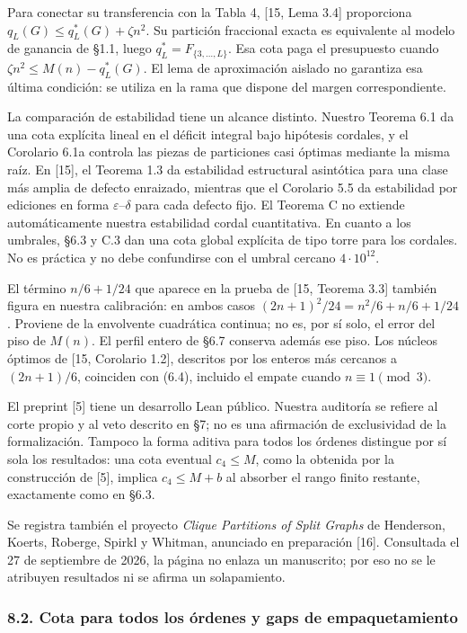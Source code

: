 \documentclass[spanish,11pt,a4paper]{article}
\begin{document}
Para conectar su transferencia con la Tabla 4, {[}15, Lema 3.4{]} proporciona \(q_L(G)\le q_L^*(G)+\zeta n^2\). Su partición fraccional exacta es equivalente al modelo de ganancia de §1.1, luego \(q_L^*=F_{\{3,\ldots,L\}}\). Esa cota paga el presupuesto cuando \(\zeta n^2\le M(n)-q_L^*(G)\). El lema de aproximación aislado no garantiza esa última condición: se utiliza en la rama que dispone del margen correspondiente.

La comparación de estabilidad tiene un alcance distinto. Nuestro Teorema 6.1 da una cota explícita lineal en el déficit integral bajo hipótesis cordales, y el Corolario 6.1a controla las piezas de particiones casi óptimas mediante la misma raíz. En {[}15{]}, el Teorema 1.3 da estabilidad estructural asintótica para una clase más amplia de defecto enraizado, mientras que el Corolario 5.5 da estabilidad por ediciones en forma \(\varepsilon\)--\(\delta\) para cada defecto fijo. El Teorema C no extiende automáticamente nuestra estabilidad cordal cuantitativa. En cuanto a los umbrales, §6.3 y C.3 dan una cota global explícita de tipo torre para los cordales. No es práctica y no debe confundirse con el umbral cercano \(4\cdot10^{12}\).

El término \(n/6+1/24\) que aparece en la prueba de {[}15, Teorema 3.3{]} también figura en nuestra calibración: en ambos casos \((2n+1)^2/24=n^2/6+n/6+1/24\). Proviene de la envolvente cuadrática continua; no es, por sí solo, el error del piso de \(M(n)\). El perfil entero de §6.7 conserva además ese piso. Los núcleos óptimos de {[}15, Corolario 1.2{]}, descritos por los enteros más cercanos a \((2n+1)/6\), coinciden con (6.4), incluido el empate cuando \(n\equiv1\pmod3\).

El preprint {[}5{]} tiene un desarrollo Lean público. Nuestra auditoría se refiere al corte propio y al veto descrito en §7; no es una afirmación de exclusividad de la formalización. Tampoco la forma aditiva para todos los órdenes distingue por sí sola los resultados: una cota eventual \(c_4\le M\), como la obtenida por la construcción de {[}5{]}, implica \(c_4\le M+b\) al absorber el rango finito restante, exactamente como en §6.3.

Se registra también el proyecto \emph{Clique Partitions of Split Graphs} de Henderson, Koerts, Roberge, Spirkl y Whitman, anunciado en preparación {[}16{]}. Consultada el 27 de septiembre de 2026, la página no enlaza un manuscrito; por eso no se le atribuyen resultados ni se afirma un solapamiento.

\subsubsection{8.2. Cota para todos los órdenes y gaps de empaquetamiento}\label{cota-para-todos-los-ordenes-y-gaps-de-empaquetamiento}
\end{document}
